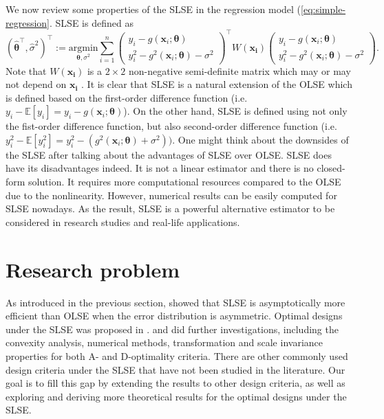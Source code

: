 \documentclass[
]{book}
\theoremstyle{definition}
\theoremstyle{definition}
\theoremstyle{definition}
\theoremstyle{definition}
\theoremstyle{remark}
\begin{document}
We now review some properties of the SLSE in the regression model (\eqref{eq:simple-regression}. SLSE is defined as
\begin{equation*}
(\boldsymbol{\hat{\theta}}^\top,\hat{\sigma}^2)^\top:=\underset{\boldsymbol{\theta},\sigma^2}{\mathrm{argmin}}\sum_{i=1}^n 
\begin{pmatrix}
y_i-g(\boldsymbol{x}_i;\boldsymbol{\theta})\\
y_i^2-g^2(\boldsymbol{x}_i;\boldsymbol{\theta})-\sigma^2
\end{pmatrix}^\top
W(\boldsymbol{x_i}) 
\begin{pmatrix}
y_i-g(\boldsymbol{x}_i;\boldsymbol{\theta})\\
y_i^2-g^2(\boldsymbol{x}_i;\boldsymbol{\theta})-\sigma^2
\end{pmatrix}.
\end{equation*}
Note that \(W(\boldsymbol{x_i})\) is a \(2\times 2\) non-negative semi-definite matrix which may or may not depend on \(\boldsymbol{x_i}\) \citep{wang2008second}. It is clear that SLSE is a natural extension of the OLSE which is defined based on the first-order difference function (i.e.~\(y_i-\mathbb{E}[y_i]=y_i-g(\boldsymbol{x}_i;\boldsymbol{\theta})\)). On the other hand, SLSE is defined using not only the fist-order difference function, but also second-order difference function (i.e.~\(y_i^2-\mathbb{E}[y_i^2]=y_i^2-(g^2(\boldsymbol{x}_i;\boldsymbol{\theta})+\sigma^2))\). One might think about the downsides of the SLSE after talking about the advantages of SLSE over OLSE. SLSE does have its disadvantages indeed. It is not a linear estimator and there is no closed-form solution. It requires more computational resources compared to the OLSE due to the nonlinearity. However, numerical results can be easily computed for SLSE nowadays. As the result, SLSE is a powerful alternative estimator to be considered in research studies and real-life applications.

\section{Research problem}\label{research-problem}

As introduced in the previous section, \citet{wang2008second} showed that SLSE is asymptotically more efficient than OLSE when the error distribution is asymmetric. Optimal designs under the SLSE was proposed in \citet{gao2014new}. \citet{bose2015optimal} \citet{yin2018optimal} and \citet{gao2017d} did further investigations, including the convexity analysis, numerical methods, transformation and scale invariance properties for both A- and D-optimality criteria. There are other commonly used design criteria under the SLSE that have not been studied in the literature. Our goal is to fill this gap by extending the results to other design criteria, as well as exploring and deriving more theoretical results for the optimal designs under the SLSE.
\end{document}

